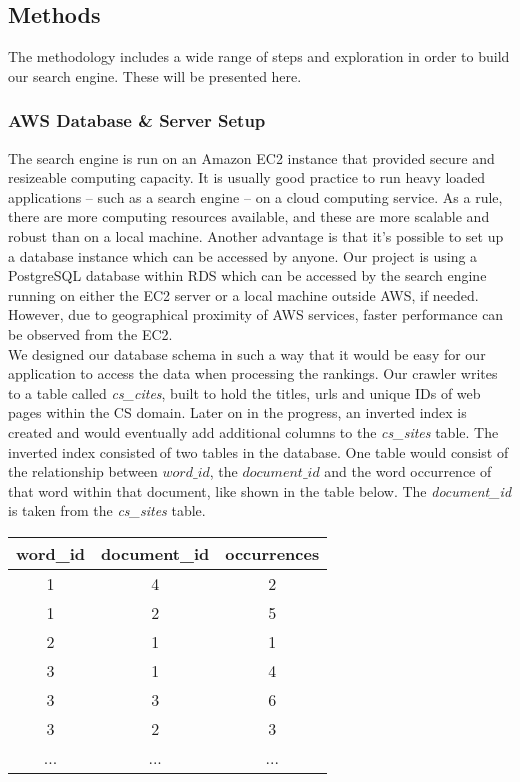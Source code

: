 
\subsection{Methods} %
\label{sub:methods}
The methodology includes a wide range of steps and exploration in order to build our search engine. These will be presented here.

\subsubsection{AWS Database \& Server Setup} %
\label{ssub:database_and_server_setup}

The search engine is run on an Amazon EC2 instance that provided secure and resizeable computing capacity. It is usually good practice to run heavy loaded applications -- such as a search engine -- on a cloud computing service. As a rule, there are more computing resources available, and these are more scalable and robust than on a local machine. Another advantage is that it's possible to set up a database instance which can be accessed by anyone. Our project is using a PostgreSQL database within RDS which can be accessed by the search engine running on either the EC2 server or a local machine outside AWS, if needed. However, due to geographical proximity of AWS services, faster performance can be observed from the EC2.\\

We designed our database schema in such a way that it would be easy for our application to access the data when processing the rankings. Our crawler writes to a table called \emph{cs\_cites}, built to hold the titles, urls and unique IDs of web pages within the CS domain.
Later on in the progress, an inverted index is created and would eventually add additional columns to the \emph{cs\_sites} table. The inverted index consisted of two tables in the database. One table would consist of the relationship between $word\_id$, the $document\_id$ and the word occurrence of that word within that document, like shown in the table below. The \emph{document\_id} is taken from the \emph{cs\_sites} table.

\begin{table}[h!]
  \begin{tabular}{|c|c|c|}
  \hline
  word\_id & document\_id & occurrences \\ \hline 
  1 & 4 & 2 \\\hline
  1 & 2 & 5 \\\hline
  2 & 1 & 1 \\\hline
  3 & 1 & 4 \\\hline
  3 & 3 & 6 \\\hline
  3 & 2 & 3 \\\hline
  ... & ... & ...
  \end{tabular}
\end{table}


